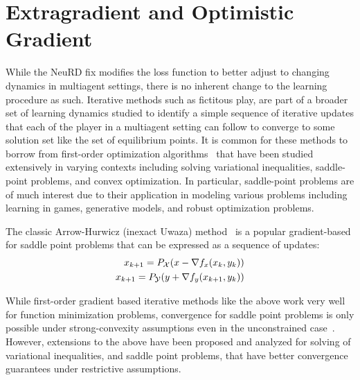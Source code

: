 \section{Extragradient and Optimistic Gradient}
While the NeuRD fix modifies the loss function to better adjust to changing dynamics in multiagent
settings, there is no inherent change to the learning procedure as such.
Iterative methods such as fictitous play, are part of a broader set of learning dynamics studied to
identify a simple sequence of iterative updates that each of the player in a multiagent setting can
follow to converge to some solution set like the set of equilibrium points.
It is common for these methods to borrow from first-order optimization
algorithms~\cite{beckFirstOrder2017} that have been studied extensively in varying contexts
including solving variational inequalities, saddle-point problems, and convex optimization.
In particular, saddle-point problems are of much interest due to their application in modeling
various problems including learning in games, generative models, and robust optimization problems.

The classic Arrow-Hurwicz (inexact Uwaza) method~\cite{arrowStudies1958} is a popular
gradient-based for saddle point problems that can be expressed as a sequence of updates:
\begin{equation}
	\label{eqn:arrowhurwicz}
	\begin{split}
		x_{k+1} = P_{\mathcal{X}} (x - \nabla f_x(x_k, y_k)) \\
		x_{k+1} = P_{\mathcal{Y}} (y + \nabla f_y(x_{k+1}, y_k)) \\
	\end{split}
\end{equation}

While first-order gradient based iterative methods like
the above work very well for function minimization problems, convergence for saddle point problems
is only possible under strong-convexity assumptions even in the unconstrained
case~\cite{heConvergence2022}.
However, extensions to the above have been proposed and analyzed for solving of variational
inequalities, and saddle point problems, that have better convergence guarantees under restrictive
assumptions.

